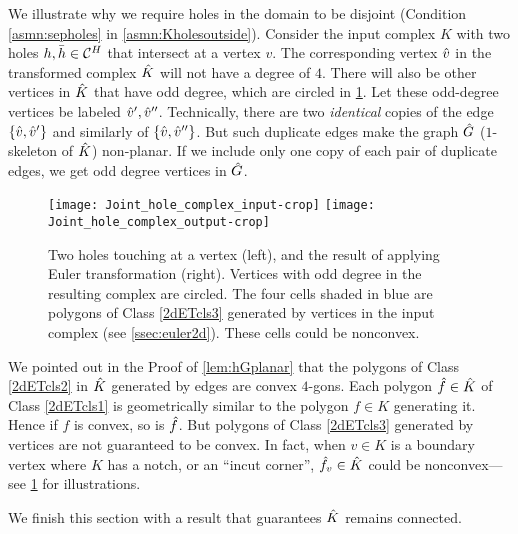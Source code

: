 \begin{rem}
  \label{rem:disjholes}
  {\rm
    We illustrate why we require holes in the domain to be disjoint (Condition \ref{asmn:sepholes} in \cref{asmn:Kholesoutside}).
    Consider the input complex $K$ with two holes $h, \bar{h} \in \mathcal{C}^H$ that intersect at a vertex $v$.
    The corresponding vertex $\hat{v}$ in the transformed complex $\hat{K}$ will not have a degree of $4$.
    There will also be other vertices in $\hat{K}$ that have odd degree, which are circled in \cref{fig:disjholes}.
    Let these odd-degree vertices be labeled $\hat{v}',\hat{v}''$.
    Technically, there are two \emph{identical} copies of the edge $\{\hat{v},\hat{v}'\}$ and similarly of $\{\hat{v},\hat{v}''\}$.
    But such duplicate edges make the graph $\hat{G}$ ($1$-skeleton of $\hat{K}$) non-planar.
    If we include only one copy of each pair of duplicate edges, we get odd degree vertices in $\hat{G}$.    \begin{figure}[htp!]
      \centering
      \texttt{[image: Joint\_hole\_complex\_input-crop]}
      \quad
      \texttt{[image: Joint\_hole\_complex\_output-crop]}
      \caption{Two holes touching at a vertex (left), and the result of applying Euler transformation (right).
        Vertices with odd degree in the resulting complex are circled.
        The four cells shaded in blue are polygons of Class \ref{2dETcls3} generated by vertices in the input complex (see \cref{ssec:euler2d}).
        These cells could be nonconvex.
      }
      \label{fig:disjholes}
    \end{figure}
    
  }
\end{rem}

We pointed out in the Proof of \cref{lem:hGplanar} that the polygons of Class \ref{2dETcls2} in $\hat{K}$ generated by edges are convex $4$-gons.
Each polygon $\hat{f} \in \hat{K}$  of Class \ref{2dETcls1} is geometrically similar to the polygon $f \in K$ generating it.
Hence if $f$ is convex, so is $\hat{f}$.
But polygons of Class \ref{2dETcls3} generated by vertices are not guaranteed to be convex.
 In fact, when $v \in K$ is a boundary vertex where $K$ has a notch, or an ``incut corner'', $\hat{f}_v \in \hat{K}$ could be nonconvex---see \cref{fig:disjholes} for illustrations.

We finish this section with a result that guarantees $\hat{K}$ remains connected.

